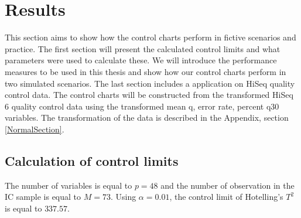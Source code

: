 \documentclass[a4paper,11pt,fleqn,twoside,notitlepage]{report}\usepackage[]{graphicx}\usepackage[]{color}
\begin{document}
\chapter{Results}
This section aims to show how the control charts perform in fictive scenarios and practice. The first section will present the calculated control limits and what parameters were used to calculate these. We will introduce the performance measures to be used in this thesis and show how our control charts perform in two simulated scenarios. The last section includes a application on HiSeq quality control data. The control charts will be constructed from the transformed HiSeq 6 quality control data using the transformed mean q, error rate, percent q30 variables. The transformation of the data is described in the Appendix, section \ref{NormalSection}. 




\section{Calculation of control limits}
The number of variables is equal to $p=48$ and the number of observation in the IC sample is equal to $M=73$. Using $\alpha=0.01$, the control limit of Hotelling's $T^2$ is equal to $337.57$. 
\end{document}
